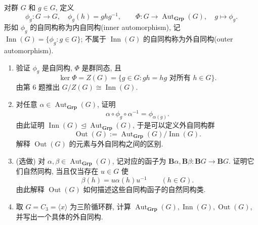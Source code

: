 \documentclass{article}
\begin{document}
\begin{problem}
对群 $G$ 和 $g\in G$, 定义
\[
  \phi_g:G\to G,\quad\phi_g(h)=ghg^{-1},\qquad
  \Phi:G\to\operatorname{Aut}_{\mathbf{Grp}}(G),\quad g\mapsto\phi_g.
\]
形如 $\phi_g$ 的自同构称为内自同构(inner automorphism), 记 $\operatorname{Inn}(G)=\{\phi_g:g\in G\}$; 不属于 $\operatorname{Inn}(G)$ 的自同构称为外自同构(outer automorphism).
\begin{enumerate}
  \item[(a)] 验证 $\phi_g$ 是自同构, $\Phi$ 是群同态, 且
  \[
    \ker\Phi=Z(G)=\{g\in G:gh=hg\text{ 对所有 }h\in G\}.
  \]
  由第 6 题推出 $G/Z(G)\cong\operatorname{Inn}(G)$.
  \item[(b)] 对任意 $\alpha\in\operatorname{Aut}_{\mathbf{Grp}}(G)$, 证明
  \[
    \alpha\circ\phi_g\circ\alpha^{-1}=\phi_{\alpha(g)}.
  \]
  由此证明 $\operatorname{Inn}(G)\unlhd\operatorname{Aut}_{\mathbf{Grp}}(G)$, 于是可以定义外自同构群
  \[
    \operatorname{Out}(G):=\operatorname{Aut}_{\mathbf{Grp}}(G)/\operatorname{Inn}(G).
  \]
  解释 $\operatorname{Out}(G)$ 的元素与外自同构之间的区别.
  \item[(c)] ({\heiti 选做}) 对 $\alpha,\beta\in\operatorname{Aut}_{\mathbf{Grp}}(G)$, 记对应的函子为 $\mathbf B\alpha,\mathbf B\beta:\mathbf BG\to\mathbf BG$. 证明它们自然同构, 当且仅当存在 $u\in G$ 使
  \[
    \beta(h)=u\alpha(h)u^{-1}\qquad(h\in G).
  \]
  由此解释 $\operatorname{Out}(G)$ 如何描述这些自同构函子的自然同构类.
  \item[(d)] 取 $G=C_3=\langle x\rangle$ 为三阶循环群, 计算 $\operatorname{Aut}_{\mathbf{Grp}}(G),\operatorname{Inn}(G),\operatorname{Out}(G)$, 并写出一个具体的外自同构.
\end{enumerate}
\end{problem}
\end{document}
